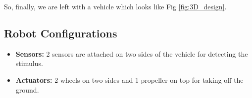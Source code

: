     So, finally, we are left with a vehicle which looks like Fig \ref{fig:3D_design}.
    \vspace{3mm}

    \subsection{Robot Configurations}
    \begin{itemize}
        \item \textbf{Sensors:} 2 sensors are attached on two sides of the vehicle for detecting the stimulus.
        \item \textbf{Actuators:} 2 wheels on two sides and 1 propeller on top for taking off the ground.
    \end{itemize}
% 
